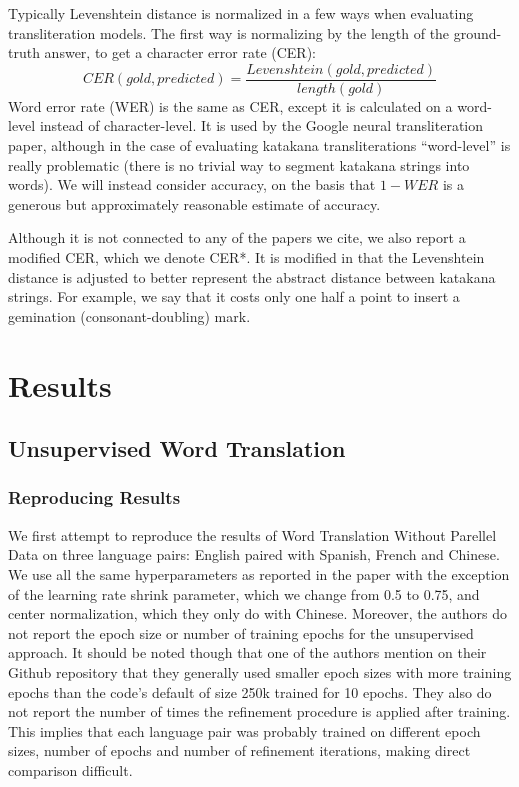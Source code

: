 \documentclass{article}
\begin{document}
Typically Levenshtein distance is normalized in a few ways
when evaluating transliteration models.
The first way is normalizing by the length of the ground-truth answer,
to get a character error rate (CER):
$$CER(gold, predicted) = \frac{Levenshtein(gold, predicted)}{length(gold)}$$
Word error rate (WER) is the same as CER,
except it is calculated on a word-level instead of character-level.
It is used by the Google neural transliteration paper,
although in the case of evaluating katakana transliterations
``word-level'' is really problematic
(there is no trivial way to segment katakana strings into words).
We will instead consider accuracy,
on the basis that $1 - WER$
is a generous but approximately reasonable estimate of accuracy.

Although it is not connected to any of the papers we cite,
we also report a modified CER,
which we denote CER*.
It is modified in that the Levenshtein distance
is adjusted to better represent the abstract distance between katakana strings.
For example,
we say that it costs only one half a point
to insert a gemination (consonant-doubling) mark.

\section*{Results}

\subsection*{Unsupervised Word Translation}

\subsubsection*{Reproducing Results}

We first attempt to reproduce the results of Word Translation Without Parellel
Data on three language pairs: English paired with Spanish, French and Chinese.
We use all the same hyperparameters as reported in the paper with the exception
of the learning rate shrink parameter, which we change from 0.5 to 0.75, and
center normalization, which they only do with Chinese.
Moreover, the authors do not report the epoch size or number of training epochs
for the unsupervised approach. It should be noted though that one of the authors 
mention on their Github repository that they generally used smaller epoch sizes
with more training epochs than the code's default of size 250k trained for 10
epochs. They also do not report the number of times the refinement procedure
is applied after training. This implies that each language pair was probably
trained on different epoch sizes, number of epochs and number of refinement
iterations, making direct comparison difficult.
\end{document}
